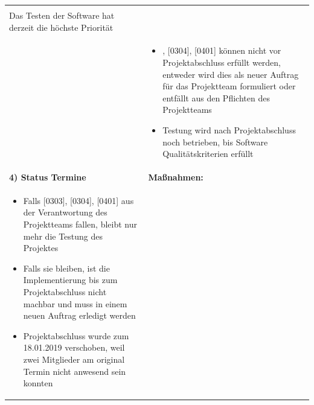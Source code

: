 \begin{center}
\begin{scriptsize}
\begin{tabularx}{\textwidth}{|p{8cm}|X|}
\begin{minipage}{.55\textwidth}
\begin{flushleft}
\begin{itemize}
         \item \:[0401] \\
            Das Testen der Software hat derzeit die höchste Priorität\\
            \vspace{0.2cm}
    \end{itemize}
    \end{flushleft}
    \end{minipage} &
    \begin{minipage}{.4\textwidth} 
    \begin{flushleft}
        \begin{itemize} \vspace{0}  
          \item\:[0303], [0304], [0401] können nicht vor Projektabschluss erfüllt werden, entweder wird dies als neuer Auftrag für das Projektteam formuliert oder entfällt aus den Pflichten des Projektteams
          \item Testung wird nach Projektabschluss noch betrieben, bis Software Qualitätskriterien erfüllt
          \vspace{0.2cm}  
    \end{itemize}
    \end{flushleft}
    \end{minipage} \\
    \hline
    \textbf{4) Status Termine} & \textbf{Maßnahmen:}\\
    \begin{minipage}{.56\textwidth} 
    \begin{flushleft}
        \begin{itemize} \vspace{0cm}
        \item Falls [0303], [0304], [0401] aus der Verantwortung des Projektteams fallen, bleibt nur mehr die Testung des Projektes
         \item Falls sie bleiben, ist die Implementierung bis zum Projektabschluss nicht machbar und muss in einem neuen Auftrag erledigt werden
         \item Projektabschluss wurde zum 18.01.2019 verschoben, weil zwei Mitglieder am original Termin nicht anwesend sein konnten
         \vspace{0.2cm}
    \end{itemize}
    \end{flushleft}
    \end{minipage} &
    \begin{minipage}{.4\textwidth} 

\end{minipage}
\end{tabularx}
\end{scriptsize}
\end{center}
